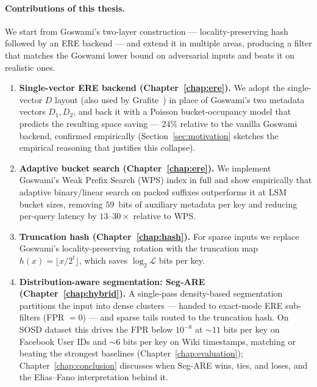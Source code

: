 \paragraph{Contributions of this thesis.}
We start from Goswami's two-layer construction --- locality-preserving
hash followed by an ERE backend --- and extend it in multiple areas,
producing a filter that matches the Goswami
lower bound on adversarial inputs and beats it on realistic ones.
\begin{enumerate}
    \item \textbf{Single-vector ERE backend (Chapter~\ref{chap:ere}).}
    We adopt the single-vector $D$ layout (also used by
    Grafite~\citep{grafite2024}) in place of Goswami's two metadata
    vectors $D_1, D_2$, and back it with a Poisson bucket-occupancy
    model that predicts the resulting space saving --- $24\%$ relative
    to the vanilla Goswami backend, confirmed empirically
    (Section~\ref{sec:motivation} sketches the empirical reasoning
    that justifies this collapse).

    \item \textbf{Adaptive bucket search (Chapter~\ref{chap:ere}).}
    We implement Goswami's Weak Prefix Search (WPS) index in full and
    show empirically that adaptive binary/linear search on packed
    suffixes outperforms it at LSM bucket sizes, removing $59$~bits of
    auxiliary metadata per key and reducing per-query latency by
    $13$--$30\times$ relative to WPS.

    \item \textbf{Truncation hash (Chapter~\ref{chap:hash}).}
    For sparse inputs we replace Goswami's locality-preserving
    rotation with the truncation map $h(x) = \lfloor x/2^t \rfloor$,
    which saves $\log_2 \mathcal{L}$ bits per key.

    \item \textbf{Distribution-aware segmentation: Seg-ARE (Chapter~\ref{chap:hybrid}).}
    A single-pass density-based segmentation partitions the input
    into dense clusters --- handed to exact-mode ERE sub-filters
    (FPR $= 0$) --- and sparse tails routed to the truncation hash.
    On SOSD dataset this drives the FPR below $10^{-8}$ at
    $\sim\!11$ bits per key on Facebook User IDs and $\sim\!6$ bits per key on
    Wiki timestamps, matching or beating the strongest baselines
    (Chapter~\ref{chap:evaluation}); Chapter~\ref{chap:conclusion}
    discusses when Seg-ARE wins, ties, and loses, and the
    Elias--Fano interpretation behind it.


\end{enumerate}
